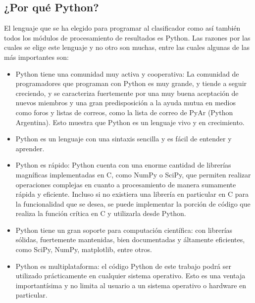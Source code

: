 	\subsection{¿Por qué Python?}	
	
	El lenguaje que se ha elegido para programar al clasificador como así también todos los módulos de procesamiento de resultados es Python. Las razones por las cuales se elige este lenguaje y no otro son muchas, entre las cuales algunas de las más importantes son:
	
			\begin{itemize}
	
			\item Python tiene una comunidad muy activa y cooperativa: La comunidad de programadores que programan con Python es muy grande, y tiende a seguir creciendo, y se caracteriza fuertemente por una muy buena aceptación de nuevos miembros y una gran predisposición a la ayuda mutua en medios como foros y listas de correos, como la lista de correo de PyAr (Python Argentina). Esto muestra que Python es un lenguaje vivo y en crecimiento.
			
			\item Python es un lenguaje con una sintaxis sencilla y es fácil de entender y aprender.
			
			\item Python es rápido: Python cuenta con una enorme cantidad de librerías magníficas implementadas en C, como NumPy o SciPy, que permiten realizar operaciones complejas en cuanto a procesamiento de manera sumamente rápida y eficiente. Incluso si no existiera una librería en particular en C para la funcionalidad que se desea, se puede implementar la porción de código que realiza la función crítica en C y utilizarla desde Python.
			
			\item Python tiene un gran soporte para computación científica: con librerías sólidas, fuertemente mantenidas, bien documentadas y áltamente eficientes, como SciPy, NumPy, matplotlib, entre otros.
			
			\item Python es multiplataforma: el código Python de este trabajo podrá ser utilizado prácticamente en cualquier sistema operativo. Esto es una ventaja importantísima y no limita al usuario a un sistema operativo o hardware en particular.
			\end{itemize}

	